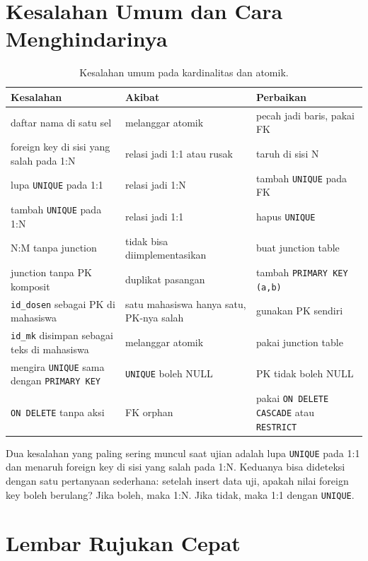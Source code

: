 \documentclass[11pt,a4paper]{article}
\begin{document}
\section{Kesalahan Umum dan Cara Menghindarinya}

\begin{table}[H]
	\centering
	\caption{Kesalahan umum pada kardinalitas dan atomik.}
	\label{tab:mistakes}
	\footnotesize
	\begin{tabularx}{\textwidth}{l X X}
		\toprule
		Kesalahan & Akibat & Perbaikan \\
		\midrule
		daftar nama di satu sel & melanggar atomik & pecah jadi baris, pakai FK \\
		foreign key di sisi yang salah pada 1:N & relasi jadi 1:1 atau rusak & taruh di sisi N \\
		lupa \texttt{UNIQUE} pada 1:1 & relasi jadi 1:N & tambah \texttt{UNIQUE} pada FK \\
		tambah \texttt{UNIQUE} pada 1:N & relasi jadi 1:1 & hapus \texttt{UNIQUE} \\
		N:M tanpa junction & tidak bisa diimplementasikan & buat junction table \\
		junction tanpa PK komposit & duplikat pasangan & tambah \texttt{PRIMARY KEY (a,b)} \\
		\texttt{id\_dosen} sebagai PK di mahasiswa & satu mahasiswa hanya satu, PK-nya salah & gunakan PK sendiri \\
		\texttt{id\_mk} disimpan sebagai teks di mahasiswa & melanggar atomik & pakai junction table \\
		mengira \texttt{UNIQUE} sama dengan \texttt{PRIMARY KEY} & \texttt{UNIQUE} boleh NULL & PK tidak boleh NULL \\
		\texttt{ON DELETE} tanpa aksi & FK orphan & pakai \texttt{ON DELETE CASCADE} atau \texttt{RESTRICT} \\
		\bottomrule
	\end{tabularx}
\end{table}

Dua kesalahan yang paling sering muncul saat ujian adalah lupa \texttt{UNIQUE} pada 1:1 dan menaruh foreign key di sisi yang salah pada 1:N. Keduanya bisa dideteksi dengan satu pertanyaan sederhana: setelah insert data uji, apakah nilai foreign key boleh berulang? Jika boleh, maka 1:N. Jika tidak, maka 1:1 dengan \texttt{UNIQUE}.

\section{Lembar Rujukan Cepat}
\end{document}
